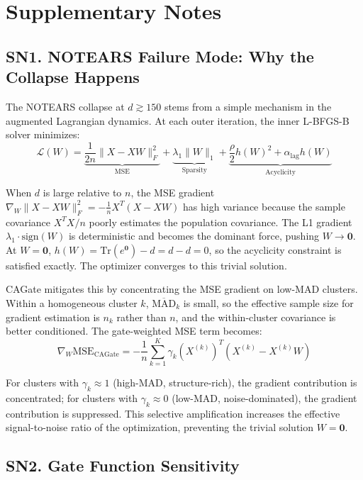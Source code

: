 \documentclass[11pt,a4paper]{article}
\begin{document}
\newpage
\section*{Supplementary Notes}

\subsection*{SN1. NOTEARS Failure Mode: Why the Collapse Happens}

The NOTEARS collapse at $d \gtrsim 150$ stems from a simple mechanism in the augmented Lagrangian dynamics. At each outer iteration, the inner L-BFGS-B solver minimizes:
\[
\mathcal{L}(W) = \underbrace{\frac{1}{2n}\|X - XW\|_F^2}_{\text{MSE}} + \underbrace{\lambda_1\|W\|_1}_{\text{Sparsity}} + \underbrace{\frac{\rho}{2}h(W)^2 + \alpha_{\text{lag}} h(W)}_{\text{Acyclicity}}
\]

When $d$ is large relative to $n$, the MSE gradient $\nabla_W \|X - XW\|_F^2 = -\frac{1}{n}X^T(X - XW)$ has high variance because the sample covariance $X^TX/n$ poorly estimates the population covariance. The L1 gradient $\lambda_1 \cdot \text{sign}(W)$ is deterministic and becomes the dominant force, pushing $W \to \mathbf{0}$. At $W = \mathbf{0}$, $h(W) = \text{Tr}(e^{\mathbf{0}}) - d = d - d = 0$, so the acyclicity constraint is satisfied exactly. The optimizer converges to this trivial solution.

CAGate mitigates this by concentrating the MSE gradient on low-MAD clusters. Within a homogeneous cluster $k$, $\overline{\text{MAD}}_k$ is small, so the effective sample size for gradient estimation is $n_k$ rather than $n$, and the within-cluster covariance is better conditioned. The gate-weighted MSE term becomes:
\[
\nabla_W \text{MSE}_{\text{CAGate}} = -\frac{1}{n}\sum_{k=1}^K \gamma_k (X^{(k)})^T(X^{(k)} - X^{(k)}W)
\]

For clusters with $\gamma_k \approx 1$ (high-MAD, structure-rich), the gradient contribution is concentrated; for clusters with $\gamma_k \approx 0$ (low-MAD, noise-dominated), the gradient contribution is suppressed. This selective amplification increases the effective signal-to-noise ratio of the optimization, preventing the trivial solution $W = \mathbf{0}$.

\subsection*{SN2. Gate Function Sensitivity}
\end{document}
